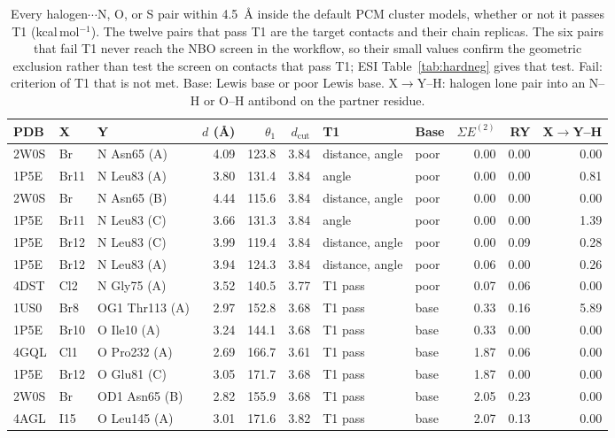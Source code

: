 \documentclass[journal=jcisd8,manuscript=suppinfo]{achemso}
\begin{document}
\begin{singlespace}
\begin{table}[!htbp]\centering\scriptsize\setlength{\tabcolsep}{3pt}
\caption{Every halogen$\cdots$N, O, or S pair within 4.5~\AA{} inside the default PCM cluster models, whether or not it passes T1 (kcal\,mol$^{-1}$). The twelve pairs that pass T1 are the target contacts and their chain replicas. The six pairs that fail T1 never reach the NBO screen in the workflow, so their small values confirm the geometric exclusion rather than test the screen on contacts that pass T1; ESI Table~\ref{tab:hardneg} gives that test. Fail: criterion of T1 that is not met. Base: Lewis base or poor Lewis base. X$\to$Y--H: halogen lone pair into an N--H or O--H antibond on the partner residue.}\label{tab:pairs}
\begin{tabular}{lllrrrllrrr}\toprule PDB & X & Y & $d$ (\AA) & $\theta_1$ & $d_\mathrm{cut}$ & T1 & Base & $\Sigma E^{(2)}$ & RY & X$\to$Y--H\\\midrule
2W0S & Br & N Asn65 (A) & 4.09 & 123.8 & 3.84 & distance, angle & poor & 0.00 & 0.00 & 0.00\\
1P5E & Br11 & N Leu83 (A) & 3.80 & 131.4 & 3.84 & angle & poor & 0.00 & 0.00 & 0.81\\
2W0S & Br & N Asn65 (B) & 4.44 & 115.6 & 3.84 & distance, angle & poor & 0.00 & 0.00 & 0.00\\
1P5E & Br11 & N Leu83 (C) & 3.66 & 131.3 & 3.84 & angle & poor & 0.00 & 0.00 & 1.39\\
1P5E & Br12 & N Leu83 (C) & 3.99 & 119.4 & 3.84 & distance, angle & poor & 0.00 & 0.09 & 0.28\\
1P5E & Br12 & N Leu83 (A) & 3.94 & 124.3 & 3.84 & distance, angle & poor & 0.06 & 0.00 & 0.26\\
4DST & Cl2 & N Gly75 (A) & 3.52 & 140.5 & 3.77 & T1 pass & poor & 0.07 & 0.06 & 0.00\\
1US0 & Br8 & OG1 Thr113 (A) & 2.97 & 152.8 & 3.68 & T1 pass & base & 0.33 & 0.16 & 5.89\\
1P5E & Br10 & O Ile10 (A) & 3.24 & 144.1 & 3.68 & T1 pass & base & 0.33 & 0.00 & 0.00\\
4GQL & Cl1 & O Pro232 (A) & 2.69 & 166.7 & 3.61 & T1 pass & base & 1.87 & 0.06 & 0.00\\
1P5E & Br12 & O Glu81 (C) & 3.05 & 171.7 & 3.68 & T1 pass & base & 1.87 & 0.00 & 0.00\\
2W0S & Br & OD1 Asn65 (B) & 2.82 & 155.9 & 3.68 & T1 pass & base & 2.05 & 0.23 & 0.00\\
4AGL & I15 & O Leu145 (A) & 3.01 & 171.6 & 3.82 & T1 pass & base & 2.07 & 0.13 & 0.00\\

\end{tabular}
\end{table}
\end{singlespace}
\end{document}
